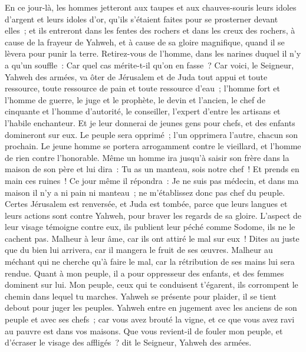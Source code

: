 \begin{multicols}{2}
En ce jour-là, les hommes jetteront aux taupes et aux chauves-souris leurs idoles d'argent et leurs idoles d'or, qu'ils s'étaient faites pour se prosterner devant elles~;
et ils entreront dans les fentes des rochers et dans les creux des rochers, à cause de la frayeur de Yahweh, et à cause de sa gloire magnifique, quand il se lèvera pour punir la terre.
Retirez-vous de l'homme, dans les narines duquel il n'y a qu'un souffle~: Car quel cas mérite-t-il qu'on en fasse~?
\VerseOne{}Car voici, le Seigneur, Yahweh des armées, va ôter de Jérusalem et de Juda tout appui et toute ressource, toute ressource de pain et toute ressource d'eau~;
l'homme fort et l'homme de guerre, le juge et le prophète, le devin et l'ancien,
le chef de cinquante et l'homme d'autorité, le conseiller, l'expert d'entre les artisans et l'habile enchanteur.
Et je leur donnerai de jeunes gens pour chefs, et des enfants domineront sur eux.
Le peuple sera opprimé~; l'un opprimera l'autre, chacun son prochain. Le jeune homme se portera arrogamment contre le vieillard, et l'homme de rien contre l'honorable.
Même un homme ira jusqu'à saisir son frère dans la maison de son père et lui dira~: Tu as un manteau, sois notre chef~! Et prends en main ces ruines~!
Ce jour même il répondra~: Je ne suis pas médecin, et dans ma maison il n'y a ni pain ni manteau~; ne m'établissez donc pas chef du peuple.
Certes Jérusalem est renversée, et Juda est tombée, parce que leurs langues et leurs actions sont contre Yahweh, pour braver les regards de sa gloire.
L'aspect de leur visage témoigne contre eux, ils publient leur péché comme Sodome, ils ne le cachent pas. Malheur à leur âme, car ils ont attiré le mal sur eux~!
Dites au juste que du bien lui arrivera, car il mangera le fruit de ses œuvres.
Malheur au méchant qui ne cherche qu'à faire le mal, car la rétribution de ses mains lui sera rendue.
Quant à mon peuple, il a pour oppresseur des enfants, et des femmes dominent sur lui. Mon peuple, ceux qui te conduisent t'égarent, ils corrompent le chemin dans lequel tu marches.
Yahweh se présente pour plaider, il se tient debout pour juger les peuples.
Yahweh entre en jugement avec les anciens de son peuple et avec ses chefs~; car vous avez brouté la vigne, et ce que vous avez ravi au pauvre est dans vos maisons.
Que vous revient-il de fouler mon peuple, et d'écraser le visage des affligés~? dit le Seigneur, Yahweh des armées.

\end{multicols}
